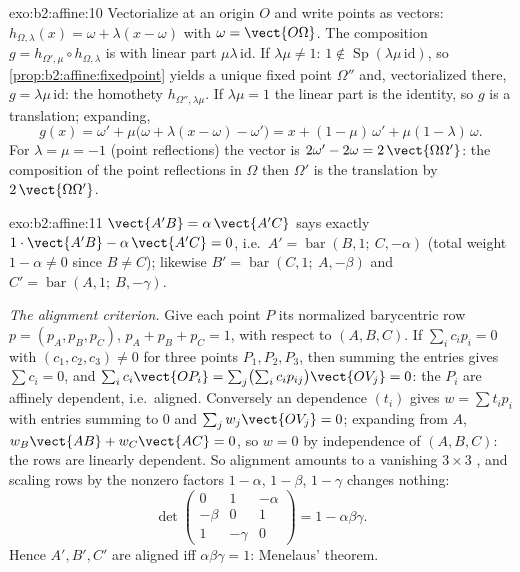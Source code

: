 \begin{solution}{exo:b2:affine:10}
Vectorialize at an origin $O$ and write points as vectors:
$h_{\Omega, \lambda}(x) = \omega + \lambda(x - \omega)$ with
$\omega = \vect{O\Omega}$. The composition $g = h_{\Omega',
\mu} \circ h_{\Omega, \lambda}$ is  with linear part
$\mu\lambda\,\mathrm{id}$. If $\lambda\mu \neq 1$: $1 \notin
\operatorname{Sp}(\lambda\mu\,\mathrm{id})$, so
\cref{prop:b2:affine:fixedpoint} yields a unique fixed point
$\Omega''$ and, vectorialized there, $g =
\lambda\mu\,\mathrm{id}$: the homothety $h_{\Omega'',
\lambda\mu}$. If $\lambda\mu = 1$ the linear part is the
identity, so $g$ is a translation; expanding,
\[
g(x) = \omega' + \mu\bigl(\omega + \lambda(x - \omega) -
\omega'\bigr) = x + (1 - \mu)\,\omega' + \mu(1 -
\lambda)\,\omega .
\]
For $\lambda = \mu = -1$ (point reflections) the vector is
$2\omega' - 2\omega = 2\,\vect{\Omega\Omega'}$: the
composition of the point reflections in $\Omega$ then
$\Omega'$ is the translation by $2\,\vect{\Omega\Omega'}$.
\end{solution}

\begin{solution}{exo:b2:affine:11}
$\vect{A'B} = \alpha\,\vect{A'C}$ says exactly $1\cdot
\vect{A'B} - \alpha\,\vect{A'C} = 0$, i.e.\ $A' =
\operatorname{bar}(B, 1;\ C, -\alpha)$ (total weight $1 -
\alpha \neq 0$ since $B \neq C$); likewise $B' =
\operatorname{bar}(C, 1;\ A, -\beta)$ and $C' =
\operatorname{bar}(A, 1;\ B, -\gamma)$.

\emph{The alignment criterion.} Give each point $P$ its
normalized barycentric row $p = (p_A, p_B, p_C)$, $p_A + p_B +
p_C = 1$, with respect to $(A, B, C)$. If $\sum_i c_i p_i = 0$
with $(c_1, c_2, c_3) \neq 0$ for three points $P_1, P_2,
P_3$, then summing the entries gives $\sum c_i = 0$, and
$\sum_i c_i \vect{OP_i} = \sum_j \bigl(\sum_i
c_ip_{ij}\bigr)\vect{OV_j} = 0$: the $P_i$ are affinely
dependent, i.e.\ aligned. Conversely an  dependence
$(t_i)$ gives $w = \sum t_ip_i$ with entries summing to $0$
and $\sum_j w_j\vect{OV_j} = 0$; expanding from $A$, $w_B
\vect{AB} + w_C\vect{AC} = 0$, so $w = 0$ by 
independence of $(A, B, C)$: the rows are linearly dependent.
So alignment amounts to a vanishing $3 \times 3$ ,
and scaling rows by the nonzero factors $1 - \alpha$, $1 -
\beta$, $1 - \gamma$ changes nothing:
\[
\det\begin{pmatrix} 0 & 1 & -\alpha\\ -\beta & 0 & 1\\ 1 &
-\gamma & 0\end{pmatrix}
= 1 - \alpha\beta\gamma .
\]
Hence $A', B', C'$ are aligned iff $\alpha\beta\gamma = 1$:
Menelaus' theorem.
\end{solution}

